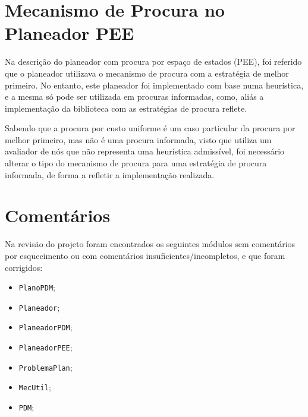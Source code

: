 \section{Mecanismo de Procura no Planeador PEE}\label{sec:mecanismo-de-procura-no-planeador-pee}

Na descrição do planeador com procura por espaço de estados (PEE), foi referido que o planeador utilizava o mecanismo de procura com a estratégia de melhor primeiro.
No entanto, este planeador foi implementado com base numa heurística, e a mesma só pode ser utilizada em procuras informadas, como, aliás a implementação da biblioteca com as estratégias de procura reflete.

Sabendo que a procura por custo uniforme é um caso particular da procura por melhor primeiro, mas não é uma procura informada, visto que utiliza um avaliador de nós que não representa uma heurística admissível, foi necessário alterar o tipo do mecanismo de procura para uma estratégia de procura informada, de forma a refletir a implementação realizada.

\section{Comentários}\label{sec:comentarios}

Na revisão do projeto foram encontrados os seguintes módulos sem comentários por esquecimento ou com comentários insuficientes/incompletos, e que foram corrigidos:

\begin{itemize}
    \item \texttt{PlanoPDM};
    \item \texttt{Planeador};
    \item \texttt{PlaneadorPDM};
    \item \texttt{PlaneadorPEE};
    \item \texttt{ProblemaPlan};
    \item \texttt{MecUtil};
    \item \texttt{PDM};
\end{itemize}
